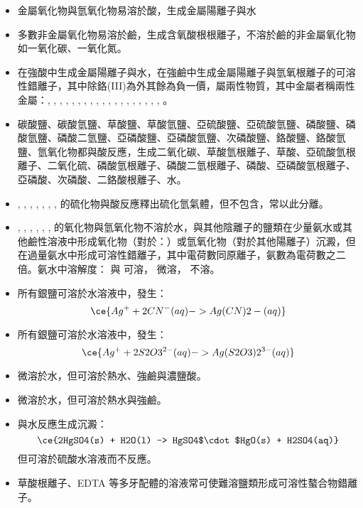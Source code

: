 \documentclass[a4paper,12pt]{report}
\begin{document}
\begin{itemize}
\item 金屬氧化物與氫氧化物易溶於酸，生成金屬陽離子與水
\item 多數非金屬氧化物易溶於鹼，生成含氧酸根根離子，不溶於鹼的非金屬氧化物如一氧化碳、一氧化氮。
\item 在強酸中生成金屬陽離子與水，在強鹼中生成金屬陽離子與氫氧根離子的可溶性錯離子，其中除鉻(III)為外其餘為負一價，屬兩性物質，其中金屬者稱兩性金屬：, , , , , , , , , , , , , , , , , , , 。
\item 碳酸鹽、碳酸氫鹽、草酸鹽、草酸氫鹽、亞硫酸鹽、亞硫酸氫鹽、磷酸鹽、磷酸氫鹽、磷酸二氫鹽、亞磷酸鹽、亞磷酸氫鹽、次磷酸鹽、鉻酸鹽、鉻酸氫鹽、氫氧化物都與酸反應，生成二氧化碳、草酸氫根離子、草酸、亞硫酸氫根離子、二氧化硫、磷酸氫根離子、磷酸二氫根離子、磷酸、亞磷酸氫根離子、亞磷酸、次磷酸、二鉻酸根離子、水。
\item {}, , , , , , ,  的硫化物與酸反應釋出硫化氫氣體，但不包含，常以此分離。
\item {}, , , , , ,  的氧化物與氫氧化物不溶於水，與其他陰離子的鹽類在少量氨水或其他鹼性溶液中形成氧化物（對於：）或氫氧化物（對於其他陽離子）沉澱，但在過量氨水中形成可溶性錯離子，其中電荷數同原離子，氨數為電荷數之二倍。氨水中溶解度： 與 可溶， 微溶， 不溶。
\item 所有銀鹽可溶於水溶液中，發生：
\[\ce{Ag^+ + 2CN^-(aq) -> Ag(CN)2-(aq)}\]
\item 所有銀鹽可溶於水溶液中，發生：
\[\ce{Ag^+ + 2S2O3^{2-}(aq) -> Ag(S2O3)2^{3-}(aq)}\]
\item {} 微溶於水，但可溶於熱水、強鹼與濃鹽酸。
\item {} 微溶於水，但可溶於熱水與強鹼。
\item {} 與水反應生成沉澱：
\[\ce{2HgSO4(s) + H2O(l) -> HgSO4$\cdot$HgO(s) + H2SO4(aq)}\]
但可溶於硫酸水溶液而不反應。
\item 草酸根離子、EDTA 等多牙配體的溶液常可使難溶鹽類形成可溶性螯合物錯離子。
\end{itemize}
\end{document}

